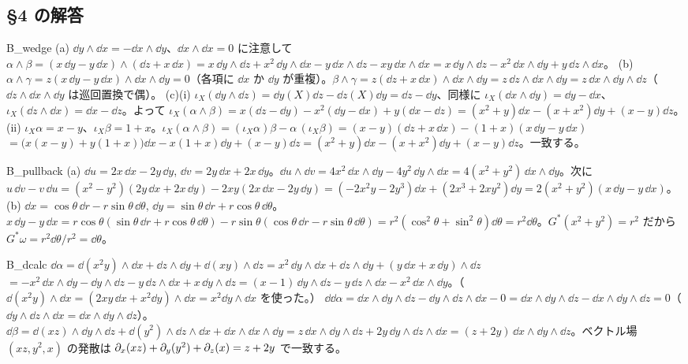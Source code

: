 
\subsection*{§4 の解答}
\begin{soll}{B_wedge}
(a) $\dd y\wedge\dd x=-\dd x\wedge\dd y$、$\dd x\wedge\dd x=0$ に注意して
$\alpha\wedge\beta=(x\,\dd y-y\,\dd x)\wedge(\dd z+x\,\dd x)=x\,\dd y\wedge\dd z+x^2\,\dd y\wedge\dd x-y\,\dd x\wedge\dd z-xy\,\dd x\wedge\dd x
=x\,\dd y\wedge\dd z-x^2\,\dd x\wedge\dd y+y\,\dd z\wedge\dd x$。
(b) $\alpha\wedge\gamma=z(x\,\dd y-y\,\dd x)\wedge\dd x\wedge\dd y=0$（各項に $\dd x$ か $\dd y$ が重複）。$\beta\wedge\gamma=z(\dd z+x\,\dd x)\wedge\dd x\wedge\dd y=z\,\dd z\wedge\dd x\wedge\dd y=z\,\dd x\wedge\dd y\wedge\dd z$（$\dd z\wedge\dd x\wedge\dd y$ は巡回置換で偶）。
(c)(i) $\iota_X(\dd y\wedge\dd z)=\dd y(X)\dd z-\dd z(X)\dd y=\dd z-\dd y$、同様に $\iota_X(\dd x\wedge\dd y)=\dd y-\dd x$、$\iota_X(\dd z\wedge\dd x)=\dd x-\dd z$。よって
$\iota_X(\alpha\wedge\beta)=x(\dd z-\dd y)-x^2(\dd y-\dd x)+y(\dd x-\dd z)=(x^2+y)\dd x-(x+x^2)\dd y+(x-y)\dd z$。
(ii) $\iota_X\alpha=x-y$、$\iota_X\beta=1+x$。$\iota_X(\alpha\wedge\beta)=(\iota_X\alpha)\beta-\alpha\,(\iota_X\beta)=(x-y)(\dd z+x\,\dd x)-(1+x)(x\,\dd y-y\,\dd x)$ $=\bigl(x(x-y)+y(1+x)\bigr)\dd x-x(1+x)\dd y+(x-y)\dd z=(x^2+y)\dd x-(x+x^2)\dd y+(x-y)\dd z$。一致する。
\end{soll}

\begin{soll}{B_pullback}
(a) $\dd u=2x\,\dd x-2y\,\dd y$, $\dd v=2y\,\dd x+2x\,\dd y$。$\dd u\wedge\dd v=4x^2\,\dd x\wedge\dd y-4y^2\,\dd y\wedge\dd x=4(x^2+y^2)\,\dd x\wedge\dd y$。次に
$u\,\dd v-v\,\dd u=(x^2-y^2)(2y\,\dd x+2x\,\dd y)-2xy(2x\,\dd x-2y\,\dd y)=(-2x^2y-2y^3)\dd x+(2x^3+2xy^2)\dd y=2(x^2+y^2)(x\,\dd y-y\,\dd x)$。
(b) $\dd x=\cos\theta\,\dd r-r\sin\theta\,\dd\theta$, $\dd y=\sin\theta\,\dd r+r\cos\theta\,\dd\theta$。$x\,\dd y-y\,\dd x=r\cos\theta(\sin\theta\,\dd r+r\cos\theta\,\dd\theta)-r\sin\theta(\cos\theta\,\dd r-r\sin\theta\,\dd\theta)=r^2(\cos^2\theta+\sin^2\theta)\dd\theta=r^2\dd\theta$。$G^*(x^2+y^2)=r^2$ だから $G^*\omega=r^2\dd\theta/r^2=\dd\theta$。
\end{soll}

\begin{soll}{B_dcalc}
$\dd\alpha=\dd(x^2y)\wedge\dd x+\dd z\wedge\dd y+\dd(xy)\wedge\dd z=x^2\,\dd y\wedge\dd x+\dd z\wedge\dd y+(y\,\dd x+x\,\dd y)\wedge\dd z$ $=-x^2\,\dd x\wedge\dd y-\dd y\wedge\dd z-y\,\dd z\wedge\dd x+x\,\dd y\wedge\dd z=(x-1)\,\dd y\wedge\dd z-y\,\dd z\wedge\dd x-x^2\,\dd x\wedge\dd y$。（$\dd(x^2y)\wedge\dd x=(2xy\,\dd x+x^2\dd y)\wedge\dd x=x^2\dd y\wedge\dd x$ を使った。）
$\dd\dd\alpha=\dd x\wedge\dd y\wedge\dd z-\dd y\wedge\dd z\wedge\dd x-0=\dd x\wedge\dd y\wedge\dd z-\dd x\wedge\dd y\wedge\dd z=0$（$\dd y\wedge\dd z\wedge\dd x=\dd x\wedge\dd y\wedge\dd z$）。
$\dd\beta=\dd(xz)\wedge\dd y\wedge\dd z+\dd(y^2)\wedge\dd z\wedge\dd x+\dd x\wedge\dd x\wedge\dd y=z\,\dd x\wedge\dd y\wedge\dd z+2y\,\dd y\wedge\dd z\wedge\dd x=(z+2y)\,\dd x\wedge\dd y\wedge\dd z$。ベクトル場 $(xz,y^2,x)$ の発散は $\partial_x(xz)+\partial_y(y^2)+\partial_z(x)=z+2y$ で一致する。
\end{soll}


